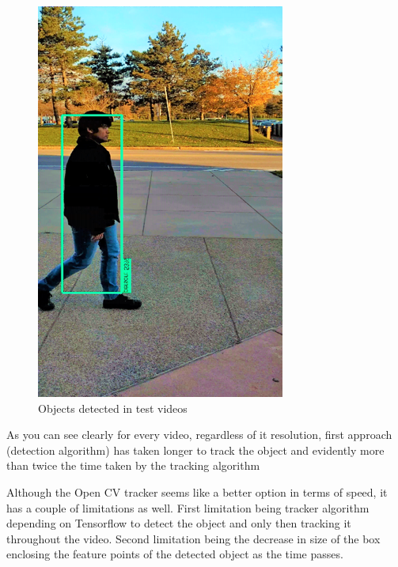 \documentclass[10pt,twocolumn,letterpaper]{article}
\begin{document}
\begin{figure}
\includegraphics[width=\linewidth]{./Picture2.png}
\caption{Objects detected in test videos}
\end{figure}

As you can see clearly for every video, regardless of it resolution, first approach (detection algorithm) has taken longer to track the object and evidently more than twice the time taken by the tracking algorithm



Although the Open CV tracker seems like a better option in terms of speed, it has a couple of limitations as well. First limitation being tracker algorithm depending on Tensorflow to detect the object and only then tracking it throughout the video. Second limitation being the decrease in size of the box enclosing the feature points of the detected object as the time passes.
\end{document}
